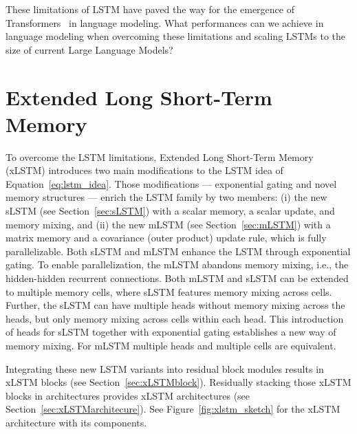 \documentclass[dvipsnames]{article}
\begin{document}
These limitations of LSTM have paved the way for 
the emergence of Transformers~\citep{Vaswani:17} in
language modeling.
What performances can we achieve in language modeling 
when overcoming these limitations and scaling LSTMs 
to the size of current Large Language Models? 






\section{Extended Long Short-Term Memory}
\label{sec:xLSTM}

To overcome the LSTM limitations, Extended Long Short-Term Memory (xLSTM) introduces 
two main modifications to the LSTM idea of Equation~\eqref{eq:lstm_idea}.
Those modifications --- exponential gating and novel memory structures --- 
enrich the LSTM family by two members:
(i) the new sLSTM (see Section~\ref{sec:sLSTM}) with a scalar memory, a scalar update, and memory mixing, and 
(ii) the new mLSTM (see Section~\ref{sec:mLSTM}) with a matrix memory and a covariance (outer product) update rule,
which is fully parallelizable.
Both sLSTM and mLSTM enhance the LSTM through exponential gating.
To enable parallelization, the mLSTM abandons memory mixing, i.e., 
the hidden-hidden recurrent connections.
Both mLSTM and sLSTM can be extended to multiple memory cells, 
where sLSTM features memory mixing across cells.
Further, the sLSTM can have multiple heads without 
memory mixing across the heads, but only memory mixing across cells within each head.
This introduction of heads for sLSTM together with exponential gating
establishes a new way of memory mixing.
For mLSTM multiple heads and multiple cells are equivalent.

Integrating these new LSTM variants into residual block modules 
results in xLSTM blocks (see Section~\ref{sec:xLSTMblock}). Residually stacking those xLSTM blocks
in architectures provides xLSTM architectures (see Section~\ref{sec:xLSTMarchitecure}).
See Figure~\ref{fig:xlstm_sketch} for the xLSTM architecture with its components.
\end{document}
